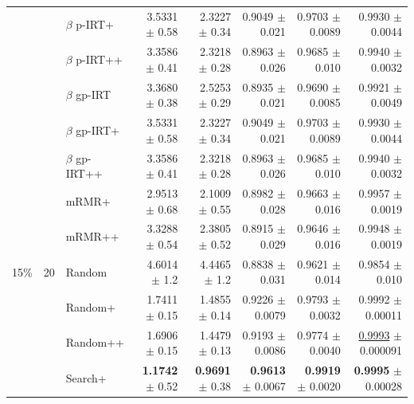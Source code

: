 \begin{longtable}{llp{}rrrrr}
 &  & $\beta$ p-IRT+ & 3.5331 {\scriptsize $\pm$ 0.58} & 2.3227 {\scriptsize $\pm$ 0.34} & 0.9049 {\scriptsize $\pm$ 0.021} & 0.9703 {\scriptsize $\pm$ 0.0089} & 0.9930 {\scriptsize $\pm$ 0.0044} \\
 &  & $\beta$ p-IRT++ & 3.3586 {\scriptsize $\pm$ 0.41} & 2.3218 {\scriptsize $\pm$ 0.28} & 0.8963 {\scriptsize $\pm$ 0.026} & 0.9685 {\scriptsize $\pm$ 0.010} & 0.9940 {\scriptsize $\pm$ 0.0032} \\
 &  & $\beta$ gp-IRT & 3.3680 {\scriptsize $\pm$ 0.38} & 2.5253 {\scriptsize $\pm$ 0.29} & 0.8935 {\scriptsize $\pm$ 0.021} & 0.9690 {\scriptsize $\pm$ 0.0085} & 0.9921 {\scriptsize $\pm$ 0.0049} \\
 &  & $\beta$ gp-IRT+ & 3.5331 {\scriptsize $\pm$ 0.58} & 2.3227 {\scriptsize $\pm$ 0.34} & 0.9049 {\scriptsize $\pm$ 0.021} & 0.9703 {\scriptsize $\pm$ 0.0089} & 0.9930 {\scriptsize $\pm$ 0.0044} \\
 &  & $\beta$ gp-IRT++ & 3.3586 {\scriptsize $\pm$ 0.41} & 2.3218 {\scriptsize $\pm$ 0.28} & 0.8963 {\scriptsize $\pm$ 0.026} & 0.9685 {\scriptsize $\pm$ 0.010} & 0.9940 {\scriptsize $\pm$ 0.0032} \\
 &  & mRMR+ & 2.9513 {\scriptsize $\pm$ 0.68} & 2.1009 {\scriptsize $\pm$ 0.55} & 0.8982 {\scriptsize $\pm$ 0.028} & 0.9663 {\scriptsize $\pm$ 0.016} & 0.9957 {\scriptsize $\pm$ 0.0019} \\
 &  & mRMR++ & 3.3288 {\scriptsize $\pm$ 0.54} & 2.3805 {\scriptsize $\pm$ 0.52} & 0.8915 {\scriptsize $\pm$ 0.029} & 0.9646 {\scriptsize $\pm$ 0.016} & 0.9948 {\scriptsize $\pm$ 0.0019} \\
\midrule
15\% & 20 & Random & 4.6014 {\scriptsize $\pm$ 1.2} & 4.4465 {\scriptsize $\pm$ 1.2} & 0.8838 {\scriptsize $\pm$ 0.031} & 0.9621 {\scriptsize $\pm$ 0.014} & 0.9854 {\scriptsize $\pm$ 0.010} \\
 &  & Random+ & 1.7411 {\scriptsize $\pm$ 0.15} & 1.4855 {\scriptsize $\pm$ 0.14} & 0.9226 {\scriptsize $\pm$ 0.0079} & 0.9793 {\scriptsize $\pm$ 0.0032} & 0.9992 {\scriptsize $\pm$ 0.00011} \\
 &  & Random++ & 1.6906 {\scriptsize $\pm$ 0.15} & 1.4479 {\scriptsize $\pm$ 0.13} & 0.9193 {\scriptsize $\pm$ 0.0086} & 0.9774 {\scriptsize $\pm$ 0.0040} & \underline{0.9993} {\scriptsize $\pm$ 0.000091} \\
 &  & Search+ & \textbf{1.1742} {\scriptsize $\pm$ 0.52} & \textbf{0.9691} {\scriptsize $\pm$ 0.38} & \textbf{0.9613} {\scriptsize $\pm$ 0.0067} & \textbf{0.9919} {\scriptsize $\pm$ 0.0020} & \textbf{0.9995} {\scriptsize $\pm$ 0.00028} \\

\end{longtable}

